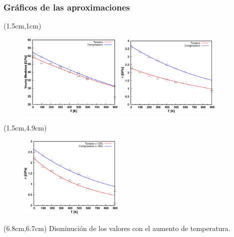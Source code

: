 \begin{frame}
 \frametitle{Gr\'aficos de las aproximaciones}
 \begin{textblock*}{10cm}(1.5cm,1cm)
 \begin{figure}[htp]
    \centering
    \includegraphics[width=5cm]{Presentacion_Mecom_2012/young_T_both.eps}
    \includegraphics[width=5cm]{Presentacion_Mecom_2012/peakstress_T_BOTH.eps}
  \end{figure} 
 \end{textblock*}
 \begin{textblock*}{5cm}(1.5cm,4.9cm)
   \begin{figure}[htp]
    \centering
    \includegraphics[width=5cm]{Presentacion_Mecom_2012/defstress_T_BOTH.eps}
  \end{figure} 
 \end{textblock*}
 \begin{textblock*}{5cm}(6.8cm,6.7cm)
  \centering
   Disminuci\'on de los valores con el aumento de temperatura.
  \end{textblock*}
\end{frame}

